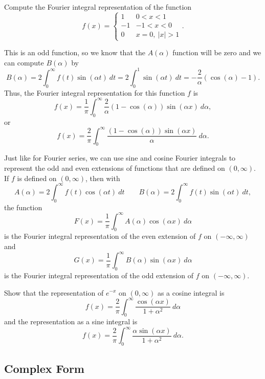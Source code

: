 \documentclass{ximera}
\begin{document}
\begin{example}
    Compute the Fourier integral representation of the function
    \[
        f(x) = 
        \begin{cases}
            1 & 0 < x < 1 \\
            -1 & -1 < x < 0 \\
            0 & x=0,\ |x| > 1
        \end{cases}.
    \]
\end{example}

\begin{exampleSol}
    This is an odd function, so we know that the $A(\alpha)$ function will be zero and we can compute $B(\alpha)$ by 
    \[ 
        B(\alpha) = 2\int_0^\infty f(t) \sin(\alpha t)\ dt = 2 \int_0^1 \sin(\alpha t)\ dt = -\frac{2}{\alpha} \left(\cos(\alpha) - 1\right). 
    \]
    Thus, the Fourier integral representation for this function $f$ is 
    \[ 
        f(x) = \frac{1}{\pi} \int_0^\infty \frac{2}{\alpha} \left(1 - \cos(\alpha)\right) \sin(\alpha x)\ d\alpha, 
    \] 
    or
    \[ 
        f(x) = \frac{2}{\pi} \int_0^\infty \frac{\left(1 - \cos(\alpha)\right) \sin(\alpha x)}{\alpha} \ d\alpha. 
    \]
\end{exampleSol}

Just like for Fourier series, we can use sine and cosine Fourier integrals to represent the odd and even extensions of functions that are defined on $(0, \infty)$. If $f$ is defined on $(0, \infty)$, then with 
\[ 
    A(\alpha) = 2\int_0^\infty f(t) \cos(\alpha t)\ dt \qquad B(\alpha) = 2\int_0^\infty f(t) \sin(\alpha t)\ dt, 
\] 
the function
\[ 
    F(x) = \frac{1}{\pi} \int_0^\infty A(\alpha) \cos(\alpha x)\ d\alpha 
\] 
is the Fourier integral representation of the even extension of $f$ on $(-\infty, \infty)$ and
\[ 
    G(x) = \frac{1}{\pi} \int_0^\infty B(\alpha) \sin(\alpha x)\ d\alpha 
\] 
is the Fourier integral representation of the odd extension of $f$ on $(-\infty, \infty)$. 

\begin{exercise}
    Show that the representation of $e^{-x}$ on $(0, \infty)$ as a cosine integral is
    \[ 
        f(x) = \frac{2}{\pi} \int_0^\infty \frac{\cos(\alpha x)}{1 + \alpha^2}\ d\alpha 
    \] 
    and the representation as a sine integral is
    \[ 
        f(x) = \frac{2}{\pi} \int_0^\infty \frac{\alpha \sin(\alpha x)}{1 + \alpha^2}\ d\alpha. 
    \]
\end{exercise}

\subsection{Complex Form}
\end{document}
